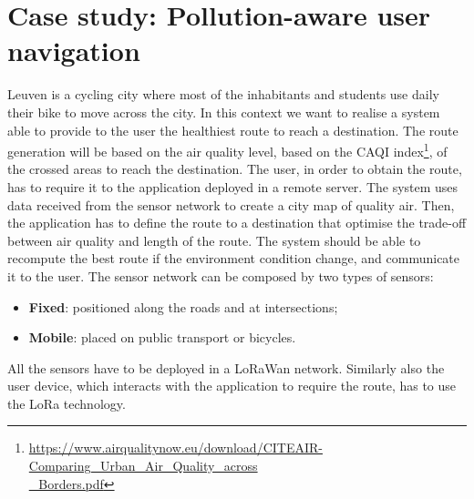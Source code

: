 \section{Case study: Pollution-aware user navigation}
\label{sec:case-staudyLoRa}


Leuven is a cycling city where most of the inhabitants and students use daily their bike to move across the city. 
In this context we want to realise a system able to provide to the user the healthiest route to reach a destination. 
The route generation will be based on the air quality level, based on the CAQI index\footnote{\href{https://www.airqualitynow.eu/download/CITEAIR-Comparing_Urban_Air_Quality_across_Borders.pdf}{https://www.airqualitynow.eu/download/CITEAIR-Comparing\_Urban\_Air\_Quality\_across\\\_Borders.pdf}}, of the crossed areas to reach the destination. 
The user, in order to obtain the route, has to require it to the application deployed in a remote server.
The system uses data received from the sensor network to create a city map of quality air.
Then, the application has to define the route to a destination that optimise the trade-off between air quality and length of the route.
The system should be able to recompute the best route if the environment condition change, and communicate it to the user.
The sensor network can be composed by two types of sensors:
\begin{itemize}
    \item \textbf{Fixed}: positioned along the roads and at intersections;
    \item \textbf{Mobile}: placed on public transport or bicycles.
\end{itemize}
All the sensors have to be deployed in a LoRaWan network.
Similarly also the user device, which interacts with the application to require the route, has to use the LoRa technology.

